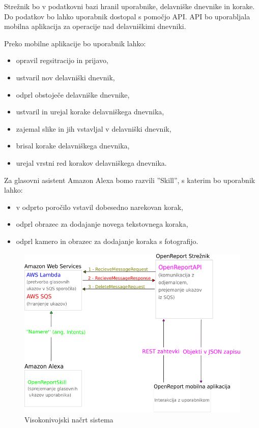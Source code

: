 \documentclass[a4paper, 12pt]{book}
\begin{document}
Strežnik bo v podatkovni bazi hranil uporabnike, delavniške dnevnike in korake.
Do podatkov bo lahko uporabnik dostopal s pomočjo API.
API bo uporabljala mobilna aplikacija za operacije nad delavniškimi dnevniki.

Preko mobilne aplikacije bo uporabnik lahko:
\begin{itemize}
	\item opravil regsitracijo in prijavo,
	\item ustvaril nov delavniški dnevnik,
	\item odprl obstoječe delavniške dnevnike,
	\item ustvaril in urejal korake delavniškega dnevnika,
	\item zajemal slike in jih vstavljal v delavniški dnevnik,
	\item brisal korake delavniškega dnevnika,
	\item urejal vrstni red korakov delavniškega dnevnika.
\end{itemize}



Za glasovni asistent Amazon Alexa bomo razvili ''Skill'', s katerim bo uporabnik lahko:

\begin{itemize}
	\item v odprto poročilo vstavil dobesedno narekovan korak,
	\item odprl obrazec za dodajanje novega tekstovnega koraka,
	\item odprl kamero in obrazec za dodajanje koraka s fotografijo.
\end{itemize}

\begin{figure}[H]
\begin{center}
\includegraphics[width=13cm]{plan}
\end{center}
\caption{Visokonivojski načrt sistema}
\label{plan}
\end{figure}
\end{document}
